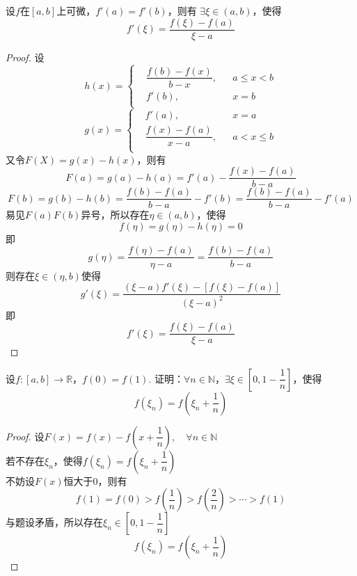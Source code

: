 \begin{theorem}[Flett中值定理]
    
    设$f$在$[a, b]$上可微，$f'(a) = f'(b)$，则有
    $\exists \xi \in (a, b)$，使得
    \[f'(\xi) = \dfrac{f(\xi) - f(a)}{\xi - a}\]

\end{theorem}

\begin{proof}
    
    设$$h(x) = \left\{
        \begin{aligned}
            & \dfrac{f(b) - f(x)}{b - x}, &&a \leq x < b \\
            &f'(b), &&x = b \\
        \end{aligned}
    \right.
    $$
    $$g(x) = \left\{
        \begin{aligned}
            &f'(a), &&x = a \\
            & \dfrac{f(x) - f(a)}{x - a}, &&a < x \leq b \\
        \end{aligned}
    \right.
    $$
    又令$F(X) = g(x) - h(x)$，则有
    \[F(a) = g(a) - h(a) = f'(a) - \dfrac{f(x) - f(a)}{b - a}\]
    \[F(b) = g(b) - h(b) = \dfrac{f(b) - f(a)}{b - a}  - f'(b) = \dfrac{f(b) - f(a)}{b - a} - f'(a)\]
    易见$F(a)F(b)$异号，所以存在$\eta \in (a, b)$，使得
    \[ f(\eta) = g(\eta) - h(\eta) = 0\]
    即
    \[g(\eta) = \dfrac{f(\eta) - f(a)}{\eta - a } =  \dfrac{f(b) - f(a)}{b - a}\]
    则存在$\xi \in (\eta, b)$使得
    \[g'(\xi) = \dfrac{(\xi - a)f'(\xi) - [f(\xi) - f(a)]}{(\xi - a)^2}\]
    即
    \[f'(\xi) = \dfrac{f(\xi) - f(a)}{\xi - a}\]

\end{proof}

\begin{proposition}

    设$f:[a, b]\to \mathbb{R}$，$f(0) = f(1)$.
    证明：$\forall n \in \mathbb{N}$，$\exists \xi \in \left[ 0, 1 - \dfrac{1}{n} \right]$，使得
    \[f(\xi_n) = f\left( \xi_n + \dfrac{1}{n} \right)\]

\end{proposition}

\begin{proof}
    
    设$F(x) = f(x) - f\left( x + \dfrac{1}{n} \right), \quad \forall n \in \mathbb{N}$ \\
    若不存在$\xi_n$，使得$f(\xi_n) = f\left( \xi_n +\dfrac{1}{n} \right)$ \\
    不妨设$F(x)$恒大于$0$，则有
    \[f(1) = f(0) > f\left( \dfrac{1}{n} \right) > f\left( \dfrac{2}{n} \right) > \cdots > f(1)\]
    与题设矛盾，所以存在$\xi_n \in \left[ 0, 1 - \dfrac{1}{n} \right]$
    \[f(\xi_n) = f\left( \xi_n + \dfrac{1}{n} \right)\]

\end{proof}


